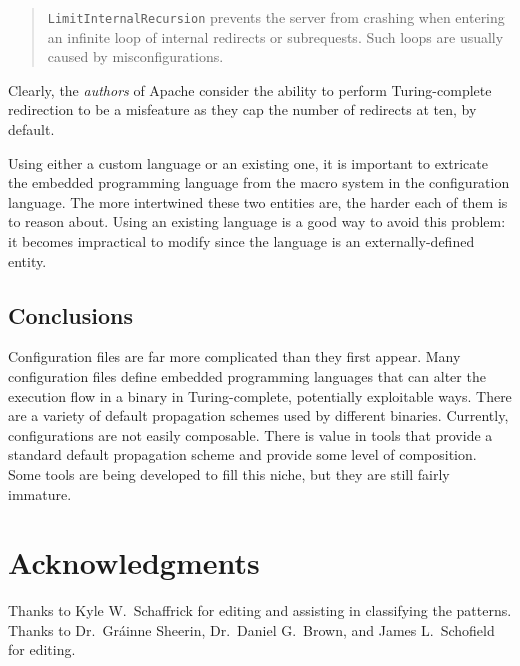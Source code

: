 \documentclass[letterpaper,twocolumn,10pt]{article}
\begin{document}
\begin{quote}
\texttt{LimitInternalRecursion} prevents the server from crashing when entering an infinite loop of internal redirects or subrequests. Such loops are usually caused by misconfigurations.
\end{quote}

\noindent Clearly, the \emph{authors} of Apache consider the ability to perform Turing-complete redirection to be a misfeature as they cap the number of redirects at ten, by default.

Using either a custom language or an existing one, it is important to extricate the embedded programming language from the macro system in the configuration language. The more intertwined these two entities are, the harder each of them is to reason about. Using an existing language is a good way to avoid this problem: it becomes impractical to modify since the language is an externally-defined entity.

\subsection{Conclusions}

Configuration files are far more complicated than they first appear. Many configuration files define embedded programming languages that can alter the execution flow in a binary in Turing-complete, potentially exploitable ways. There are a variety of default propagation schemes used by different binaries. Currently, configurations are not easily composable. There is value in tools that provide a standard default propagation scheme and provide some level of composition. Some tools are being developed to fill this niche, but they are still fairly immature.

\section{Acknowledgments}
Thanks to Kyle W.~Schaffrick for editing and assisting in classifying the patterns. Thanks to Dr.~Gr\'ainne Sheerin, Dr.~Daniel G.~Brown, and James L.~Schofield for editing.

{\footnotesize 
}

\theendnotes
\end{document}
